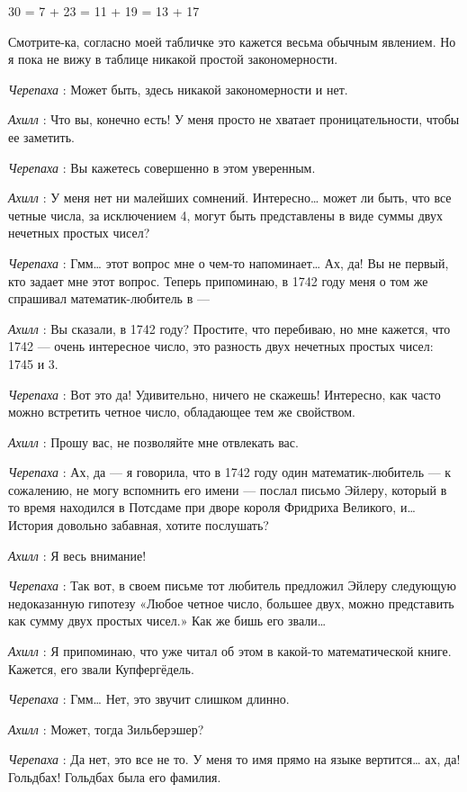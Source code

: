 30 = 7 + 23 = 11 + 19 = 13 + 17

Смотрите-ка, согласно моей табличке это кажется весьма обычным явлением. Но я пока не вижу в таблице никакой простой закономерности.

\emph{Черепаха} : Может быть, здесь никакой закономерности и нет.

\emph{Ахилл} : Что вы, конечно есть! У меня просто не хватает проницательности, чтобы ее заметить.

\emph{Черепаха} : Вы кажетесь совершенно в этом уверенным.

\emph{Ахилл} : У меня нет ни малейших сомнений. Интересно\ldots{} может ли быть, что все четные числа, за исключением 4, могут быть представлены в виде суммы двух нечетных простых чисел?

\emph{Черепаха} : Гмм\ldots{} этот вопрос мне о чем-то напоминает\ldots{} Ах, да! Вы не первый, кто задает мне этот вопрос. Теперь припоминаю, в 1742 году меня о том же спрашивал математик-любитель в ---

\emph{Ахилл} : Вы сказали, в 1742 году? Простите, что перебиваю, но мне кажется, что 1742 --- очень интересное число, это разность двух нечетных простых чисел: 1745 и 3.

\emph{Черепаха} : Вот это да! Удивительно, ничего не скажешь! Интересно, как часто можно встретить четное число, обладающее тем же свойством.

\emph{Ахилл} : Прошу вас, не позволяйте мне отвлекать вас.

\emph{Черепаха} : Ах, да --- я говорила, что в 1742 году один математик-любитель --- к сожалению, не могу вспомнить его имени --- послал письмо Эйлеру, который в то время находился в Потсдаме при дворе короля Фридриха Великого, и\ldots{} История довольно забавная, хотите послушать?

\emph{Ахилл} : Я весь внимание!

\emph{Черепаха} : Так вот, в своем письме тот любитель предложил Эйлеру следующую недоказанную гипотезу «Любое четное число, большее двух, можно представить как сумму двух простых чисел.» Как же бишь его звали\ldots{}

\emph{Ахилл} : Я припоминаю, что уже читал об этом в какой-то математической книге. Кажется, его звали Купфергёдель.

\emph{Черепаха} : Гмм\ldots{} Нет, это звучит слишком длинно.

\emph{Ахилл} : Может, тогда Зильберэшер?

\emph{Черепаха} : Да нет, это все не то. У меня то имя прямо на языке вертится\ldots{} ах, да! Гольдбах! Гольдбах была его фамилия.

